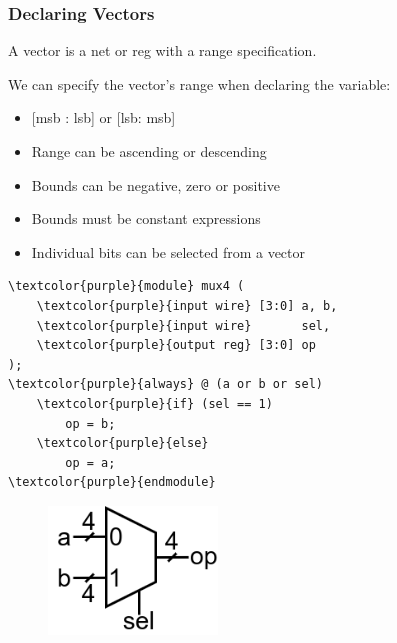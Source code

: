 \documentclass[t, notes, xcolor=table]{beamer}
\begin{document}
\begin{frame}[fragile]
\frametitle{Declaring Vectors}

A vector is a net or reg with a range specification.

We can specify the vector's range when declaring the variable:
\begin{itemize}
\item {[msb : lsb]} or {[lsb: msb]}
\item Range can be ascending or descending
\item Bounds can be negative, zero or positive
\item Bounds must be constant expressions
\item Individual bits can be selected from a vector
\end{itemize}

\begin{multicols}{2}
{\footnotesize%
\begin{Verbatim}[commandchars=\\\{\}, tabsize=2]
\textcolor{purple}{module} mux4 (
	\textcolor{purple}{input wire} [3:0] a, b,
	\textcolor{purple}{input wire}       sel,
	\textcolor{purple}{output reg} [3:0] op
);
\textcolor{purple}{always} @ (a or b or sel)
	\textcolor{purple}{if} (sel == 1)
		op = b;
	\textcolor{purple}{else}
		op = a;
\textcolor{purple}{endmodule}

\end{Verbatim}
}

\vfill

\columnbreak

\begin{figure}
    \includegraphics[width=0.40\textwidth]{img/04_vectors.png}
\end{figure}
\end{multicols}

\end{frame}

\end{document}
